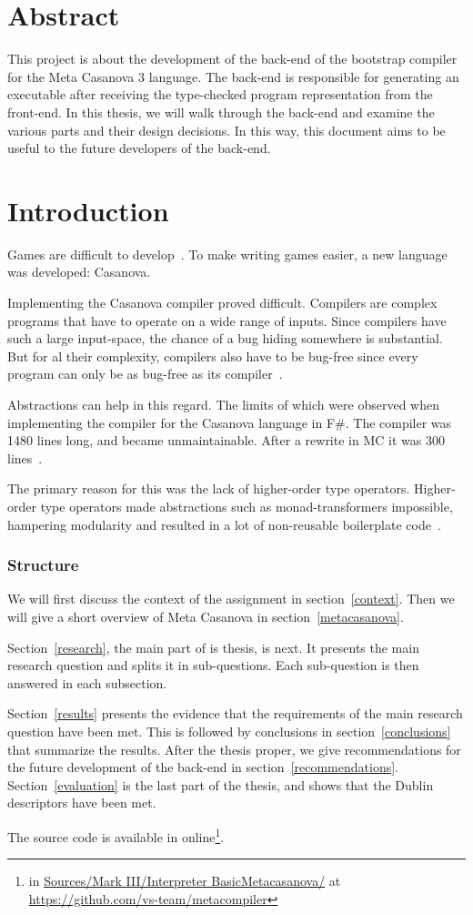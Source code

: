 \section*{Abstract}
This project is about the development of the back-end of the bootstrap compiler for the Meta Casanova 3 language.
The back-end is responsible for generating an executable after receiving the type-checked program representation from the front-end.
In this thesis, we will walk through the back-end and examine the various parts and their design decisions.
In this way, this document aims to be useful to the future developers of the back-end.

\section{Introduction}
Games are difficult to develop~\cite{blow}.
To make writing games easier, a new language was developed: Casanova.

Implementing the Casanova compiler proved difficult.
Compilers are complex programs that have to operate on a wide range of inputs.
Since compilers have such a large input-space, the chance of a bug hiding somewhere is substantial. 
But for al their complexity, compilers also have to be bug-free since every program can only be as bug-free as its compiler~\cite{tompson}.

Abstractions can help in this regard.
The limits of which were observed when implementing the compiler for the Casanova language in F\#.
The compiler was 1480 lines long, and became unmaintainable.
After a rewrite in MC it was 300 lines~\cite{maggiore}.

The primary reason for this was the lack of higher-order type operators.
Higher-order type operators made abstractions such as monad-transformers impossible, hampering modularity and resulted in a lot of non-reusable boilerplate code~\cite{pierce}.

\subsubsection{Structure}
We will first discuss the context of the assignment in section~\ref{context}.
Then we will give a short overview of Meta Casanova in section~\ref{metacasanova}.

Section~\ref{research}, the main part of is thesis, is next.
It presents the main research question and splits it in sub-questions.
Each sub-question is then answered in each subsection.

Section~\ref{results} presents the evidence that the requirements of the main research question have been met.
This is followed by conclusions in section~\ref{conclusions} that summarize the results.
After the thesis proper, we give recommendations for the future development of the back-end in section~\ref{recommendations}.
Section~\ref{evaluation} is the last part of the thesis, and shows that the Dublin descriptors have been met.

The source code is available in online\footnote{in \url{Sources/Mark III/Interpreter BasicMetacasanova/} at \url{https://github.com/vs-team/metacompiler}}.
